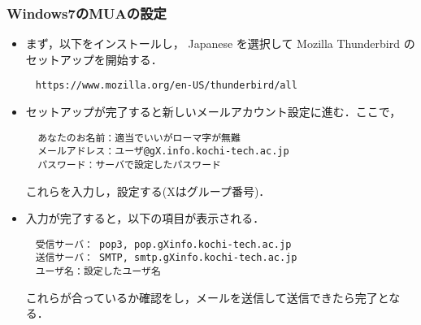 \documentclass[a4j,titlepage]{jarticle}
\begin{document}
\subsubsection{Windows7のMUAの設定}
\begin{itemize}
\item まず，以下をインストールし， Japanese を選択して Mozilla Thunderbird のセットアップを開始する．
  \begin{center}
    \begin{screen}
\begin{verbatim}
　https://www.mozilla.org/en-US/thunderbird/all 
\end{verbatim}
    \end{screen}
  \end{center}

\item セットアップが完了すると新しいメールアカウント設定に進む．ここで，
  \begin{center}
    \begin{screen}
\begin{verbatim}
  あなたのお名前：適当でいいがローマ字が無難
  メールアドレス：ユーザ@gX.info.kochi-tech.ac.jp
  パスワード：サーバで設定したパスワード
\end{verbatim}
    \end{screen}
  \end{center}

これらを入力し，設定する(Xはグループ番号)．

\item 入力が完了すると，以下の項目が表示される．
  \begin{center}
    \begin{screen}
\begin{verbatim}
　受信サーバ： pop3, pop.gXinfo.kochi-tech.ac.jp
　送信サーバ： SMTP, smtp.gXinfo.kochi-tech.ac.jp
　ユーザ名：設定したユーザ名
\end{verbatim}
    \end{screen}
  \end{center}

これらが合っているか確認をし，メールを送信して送信できたら完了となる．

\end{itemize}
\end{document}
